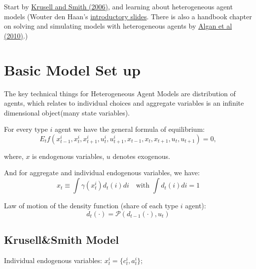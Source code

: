 
% 



Start by \href{http://www.econ.yale.edu/smith/paper15.pdf}{Krusell and Smith (2006)}, and learning about heterogeneous agent models (Wouter den Haan's \href{http://www.wouterdenhaan.com/numerical/introhetero.pdf}{introductory slides}. There is also a handbook chapter on solving and simulating models with heterogeneous agents by \href{http://www.wouterdenhaan.com/numerical/handbookhetero.pdf}{Algan et al (2010)}.) \\


\section{Basic Model Set up}

The key technical things for Heterogeneous Agent Models are distribution of agents, which relates to individual choices and aggregate variables is an {\color{red} infinite dimensional object}(many state variables). 

For every type $i$ agent we have the general formula of equilibrium: 
\[ 
E_t f(x^i_{t-1}, x^i_{t}, x^i_{t+1},u^i_{t},u^i_{t+1},x_{t-1}, x_{t}, x_{t+1},u_{t},u_{t+1})=0, 
\]


where, $x$ is endogenous variables, $u$ denotes exogenous. 

And for aggregate and individual endogenous variables, we have: 
\[
x_t \equiv \int \gamma (x_t^i)d_t (i)di \quad \text{with } \int d_t (i)di = 1 
\]

Law of motion of the density function (share of each type $i$ agent): 
\[ d_t (\cdot) = \mathcal{P}(d_{t-1}(\cdot), u_t)\]

\subsection{Krusell\&Smith Model}

Individual endogenous variables: $x^i_t = \{c^i_t,a^i_t\}$;\\

